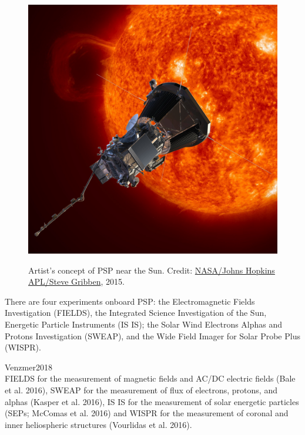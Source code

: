 \begin{figure}[htb]
\begin{floatrow}
{			\includegraphics[width=\Xhsize]{figures_of_others/images/SPP_ObservingSun2_square.jpg}
		}{
			\caption[Credit: \href{http://parkersolarprobe.jhuapl.edu/Multimedia/Images.php}{NASA/Johns Hopkins APL}, 2015.]
			{Artist’s concept of PSP near the Sun. Credit: \href{http://parkersolarprobe.jhuapl.edu/Multimedia/Images.php}{NASA/Johns Hopkins APL/Steve Gribben}, 2015.}
			\label{fig:SPP_ObservingSun2}
		}
		\end{floatrow}
\end{figure}


There are four experiments onboard PSP: the Electromagnetic Fields Investigation (FIELDS), the Integrated Science Investigation of
the Sun, Energetic Particle Instruments (IS IS); the Solar Wind Electrons Alphas and Protons Investigation (SWEAP), and the Wide Field Imager for Solar Probe Plus (WISPR).


Venzmer2018\\
FIELDS for the measurement of magnetic fields and AC/DC electric fields (Bale et al. 2016), SWEAP for the measurement of flux of electrons, protons, and alphas (Kasper et al. 2016), IS IS for the measurement of solar energetic particles (SEPs; McComas et al. 2016) and WISPR for
the measurement of coronal and inner heliospheric structures (Vourlidas et al. 2016).

